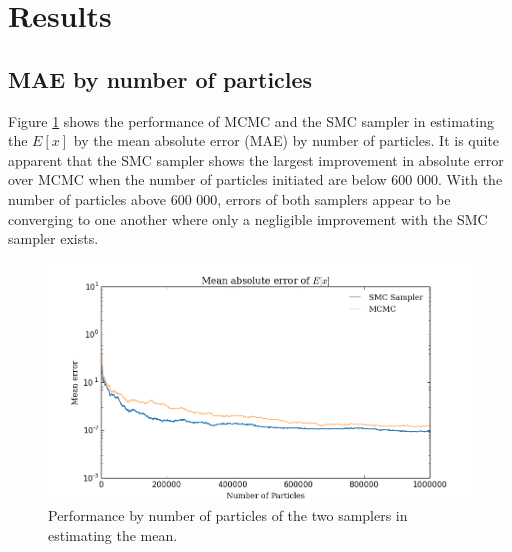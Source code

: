 \documentclass[12pt]{elsarticle}
\begin{document}


\section*{Results}
\subsection*{MAE by number of particles}
Figure \ref{ex} shows the performance of MCMC and the SMC sampler in estimating the $E[x]$ by the mean absolute error (MAE) by number of particles. It is quite apparent that the SMC sampler shows the largest improvement in absolute error over MCMC when the number of particles initiated are below 600 000. With the number of particles above 600 000, errors of both samplers appear to be converging to one another where only a negligible improvement with the SMC sampler exists.



\begin{figure}[htbp]
\begin{center}
\includegraphics[width = \textwidth]{plots/E_X.png}
\caption{Performance by number of particles of the two samplers in estimating the mean.}
\label{ex}
\end{center}
\end{figure}
\end{document}
